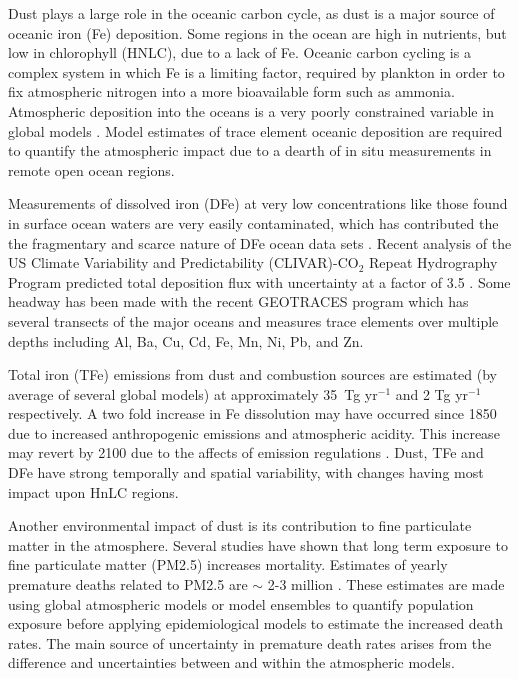   Dust plays a large role in the oceanic carbon cycle, as dust is a major source of oceanic iron (Fe) deposition.
  Some regions in the ocean are high in nutrients, but low in chlorophyll (HNLC), due to a lack of Fe.
  Oceanic carbon cycling is a complex system in which Fe is a limiting factor, required by plankton in order to fix atmospheric nitrogen into a more bioavailable form such as ammonia.
  Atmospheric deposition into the oceans is a very poorly constrained variable in global models \citep{Grand2015}.
  Model estimates of trace element oceanic deposition are required to quantify the atmospheric impact due to a dearth of in situ measurements in remote open ocean regions.

  Measurements of dissolved iron (DFe) at very low concentrations like those found in surface ocean waters are very easily contaminated, which has contributed the the fragmentary and scarce nature of DFe ocean data sets \citep{Rijkenberg2014}.
  Recent analysis of the US Climate Variability and Predictability (CLIVAR)-CO$_{2}$ Repeat Hydrography Program predicted total deposition flux with uncertainty at a factor of 3.5 \citep{Grand2015}.
  Some headway has been made with the recent GEOTRACES program which has several transects of the major oceans and measures trace elements over multiple depths including Al, Ba, Cu, Cd, Fe, Mn, Ni, Pb, and Zn.
    
  Total iron (TFe) emissions from dust and combustion sources are estimated (by average of several global models) at approximately 35~Tg yr$^{-1}$ and 2 Tg yr$^{-1}$ respectively. A two fold increase in Fe dissolution may have occurred since 1850 due to increased anthropogenic emissions and atmospheric acidity.
  This increase may revert by 2100 due to the affects of emission regulations \citep{Myriokefalitakis2015}.
  Dust, TFe and DFe have strong temporally and spatial variability, with changes having most impact upon HnLC regions.

  Another environmental impact of dust is its contribution to fine particulate matter in the atmosphere.
  Several studies have shown that long term exposure to fine particulate matter (PM2.5) increases mortality. 
  Estimates of yearly premature deaths related to PM2.5 are $\sim$ 2-3 million \citep{Hoek2013, Krewski2009, Silva2013, Lelieveld2015}.   
  These estimates are made using global atmospheric models or model ensembles to quantify population exposure before applying epidemiological models to estimate the increased death rates.
  The main source of uncertainty in premature death rates arises from the difference and uncertainties between and within the atmospheric models.

